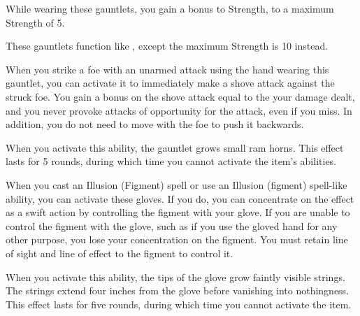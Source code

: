 
 While wearing these gauntlets, you gain a  bonus to Strength, to a maximum Strength of 5.


 These gauntlets function like , except the maximum Strength is 10 instead.


 When you strike a foe with an unarmed attack using the hand wearing this gauntlet, you can activate it to immediately make a shove attack against the struck foe. You gain a bonus on the shove attack equal to the your damage dealt, and you never provoke attacks of opportunity for the attack, even if you miss. In addition, you do not need to move with the foe to push it backwards.

When you activate this ability, the gauntlet grows small ram horns. This effect lasts for 5 rounds, during which time you cannot activate the item's abilities.


 When you cast an Illusion (Figment) spell or use an Illusion (figment) spell-like ability, you can activate these gloves. If you do, you can concentrate on the effect as a swift action by controlling the figment with your glove. If you are unable to control the figment with the glove, such as if you use the gloved hand for any other purpose, you lose your concentration on the figment. You must retain line of sight and line of effect to the figment to control it.

When you activate this ability, the tips of the glove grow faintly visible strings. The strings extend four inches from the glove before vanishing into nothingness. This effect lasts for five rounds, during which time you cannot activate the item.


